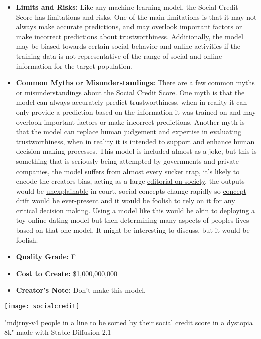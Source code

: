 \begin{itemize}
\begin{enumerate}
        \end{enumerate}
    \item \textbf{Limits and Risks:} Like any machine learning model, the Social Credit Score has limitations and risks. One of the main limitations is that it may not always make accurate predictions, and may overlook important factors or make incorrect predictions about trustworthiness. Additionally, the model may be biased towards certain social behavior and online activities if the training data is not representative of the range of social and online information for the target population.
    \item \textbf{Common Myths or Misunderstandings:} There are a few common myths or misunderstandings about the Social Credit Score. One myth is that the model can always accurately predict trustworthiness, when in reality it can only provide a prediction based on the information it was trained on and may overlook important factors or make incorrect predictions. Another myth is that the model can replace human judgement and expertise in evaluating trustworthiness, when in reality it is intended to support and enhance human decision-making processes. This model is included almost as a joke, but this is something that is seriously being attempted by governments and private companies, the model suffers from almost every sucker trap, it's likely to encode the creators bias, acting as a large \hyperref[sec:janitor]{editorial on society}, the outputs would be \hyperref[sec:explain]{unexplainable} in court, social concepts change rapidly so \hyperref[sec:drift]{concept drift} would be ever-present and it would be foolish to rely on it for any \hyperref[sec:creative]{critical} decision making. Using a model like this would be akin to deploying a toy online dating model but then determining many aspects of peoples lives based on that one model. It might be interesting to discuss, but it would be foolish.
    \item \textbf{Quality Grade:} F
    \item \textbf{Cost to Create:} \$1,000,000,000
    \item \textbf{Creator's Note:} Don't make this model.
\end{itemize}

\begin{marginfigure}[-5.5cm]
        \texttt{[image: socialcredit]}
        \caption{"mdjrny-v4 people in a line to be sorted by their social credit score in a dystopia 8k" made with Stable Diffusion 2.1}
\end{marginfigure}

